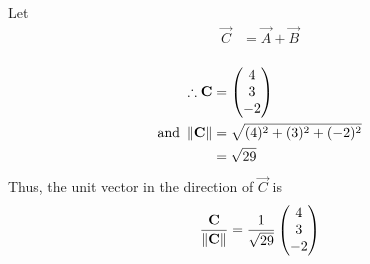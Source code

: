 Let 
\begin{align}
    \vec{C} &= \vec{A} + \vec{B} \\
\end{align}

\begin{align}
    \therefore \mathbf{C} &= \begin{pmatrix}4\\3\\-2\end{pmatrix}\\
\text{and }    \left\lVert\mathbf{C}\right\rVert &= \sqrt{(4)^2 + (3)^2 + (-2)^2}\\
&= \sqrt{29}
\end{align}
Thus, 
the unit vector in the direction of $\vec{C}$ is 
\begin{align}
    \frac{\mathbf{C}}{\left\lVert\mathbf{C}\right\rVert}
 = \frac{1}{\sqrt{29}} \begin{pmatrix}4\\3\\-2\end{pmatrix}
\end{align}
